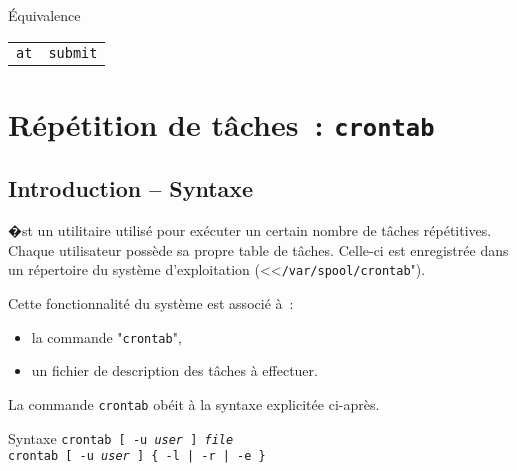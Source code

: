 \begin{definition}{\'{E}quivalence}
\begin{center}
\begin{tabular}{|c|c|}
	\hline
		{\Unix}		&	{\OpenVMS}			\\
	\hline \hline
		{\tt at}		&	{\tt submit}			\\
	\hline
\end{tabular}
\end{center}
\end{definition}

\section{R{\'e}p{\'e}tition de t{\^a}ches~: {\tt crontab}}

\subsection{Introduction -- Syntaxe}

�st un utilitaire utilis{\'e} pour ex{\'e}cuter un certain nombre de t{\^a}ches
r{\'e}p{\'e}titives. Chaque utilisateur poss{\`e}de sa propre table de t{\^a}ches. Celle-ci est
enregistr{\'e}e dans un r{\'e}pertoire du syst{\`e}me d'exploitation (<<{\tt /var/spool/crontab}").

Cette fonctionnalit{\'e} du syst{\`e}me est associ{\'e} {\`a}~:
\begin{itemize}
	\item	la commande "{\tt crontab}",
	\item	un fichier de description des t{\^a}ches {\`a} effectuer.
\end{itemize}

La commande {\tt crontab} ob{\'e}it {\`a} la syntaxe explicit{\'e}e ci-apr{\`e}s.

\begin{definition}{Syntaxe}
{\tt crontab [ -u {\sl user} ] {\sl file}}\\
{\tt crontab [ -u {\sl user} ] \{ -l | -r | -e \}}
\end{definition}

